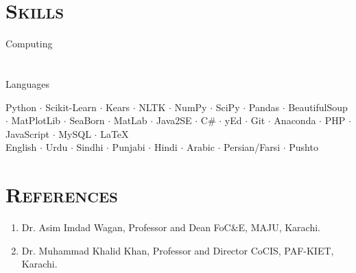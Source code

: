 \documentclass[a4paper, 10pt]{article}
\begin{document}
\section*{\normalfont\textsc{Skills}}
\hfill\begin{minipage}{0.17\textwidth}
Computing\textcolor{lightgray}{\dotfill}\\\\\\
Languages\textcolor{lightgray}{\dotfill}
\end{minipage}%
\begin{minipage}{0.8\textwidth}
Python $\cdot$ Scikit-Learn $\cdot$ Kears $\cdot$ NLTK $\cdot$ NumPy  $\cdot$ SciPy $\cdot$ Pandas $\cdot$ BeautifulSoup $\cdot$ MatPlotLib $\cdot$ SeaBorn $\cdot$ MatLab $\cdot$ Java2SE $\cdot$ C\# $\cdot$ yEd $\cdot$ Git $\cdot$ Anaconda $\cdot$ PHP $\cdot$ JavaScript $\cdot$ MySQL $\cdot$ \LaTeX\\
English $\cdot$ Urdu $\cdot$ Sindhi $\cdot$ Punjabi $\cdot$ Hindi $\cdot$ Arabic $\cdot$ Persian/Farsi $\cdot$ Pushto 
\end{minipage}

\section*{\normalfont\textsc{References}}
\begin{enumerate}
\itemsep-4pt
 \item Dr. Asim Imdad Wagan, Professor and Dean FoC\&E, MAJU, Karachi.
 \item Dr. Muhammad Khalid Khan, Professor and Director CoCIS, PAF-KIET, Karachi.
\end{enumerate}
\end{document}
